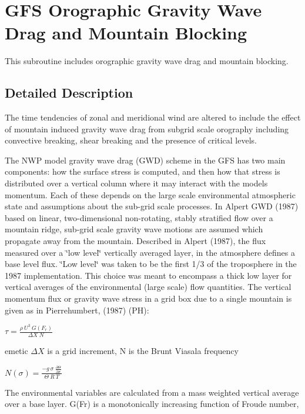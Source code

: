 \hypertarget{group___g_f_s__ogwd}{}\section{G\+FS Orographic Gravity Wave Drag and Mountain Blocking}
\label{group___g_f_s__ogwd}


This subroutine includes orographic gravity wave drag and mountain blocking.  




\subsection{Detailed Description}
The time tendencies of zonal and meridional wind are altered to include the effect of mountain induced gravity wave drag from subgrid scale orography including convective breaking, shear breaking and the presence of critical levels.

The N\+WP model gravity wave drag (G\+WD) scheme in the G\+FS has two main components\+: how the surface stress is computed, and then how that stress is distributed over a vertical column where it may interact with the models momentum. Each of these depends on the large scale environmental atmospheric state and assumptions about the sub-\/grid scale processes. In Alpert G\+WD (1987) based on linear, two-\/dimensional non-\/rotating, stably stratified flow over a mountain ridge, sub-\/grid scale gravity wave motions are assumed which propagate away from the mountain. Described in Alpert (1987), the flux measured over a \char`\"{}low level\char`\"{} vertically averaged layer, in the atmosphere defines a base level flux. \char`\"{}\+Low level\char`\"{} was taken to be the first 1/3 of the troposphere in the 1987 implementation. This choice was meant to encompass a thick low layer for vertical averages of the environmental (large scale) flow quantities. The vertical momentum flux or gravity wave stress in a grid box due to a single mountain is given as in Pierrehumbert, (1987) (PH)\+:

$ \tau = \frac {\rho \: U^{3}\: G(F_{r})} {\Delta X \; N } $

emetic $ \Delta X $ is a grid increment, N is the Brunt Viasala frequency

$ N(\sigma) = \frac{-g \: \sigma \: \frac{\partial\Theta}{\partial\sigma}}{\Theta \:R \:T} $

The environmental variables are calculated from a mass weighted vertical average over a base layer. G(\+Fr) is a monotonically increasing function of Froude number,

